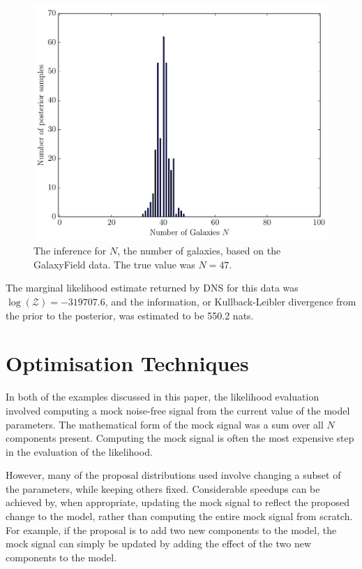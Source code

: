 \documentclass[letterpaper, 11pt]{article}
\begin{document}
\begin{figure}
\begin{center}
\includegraphics[scale=0.5]{N_galaxy_result.pdf}
\caption{The inference for $N$, the number of galaxies, based on the
GalaxyField data. The true value was $N=47$.
\label{fig:N_galaxy_result}}
\end{center}
\end{figure}

The marginal likelihood estimate returned by DNS for this data was
$\log(\mathcal{Z}) = -319707.6$, and the information, or Kullback-Leibler
divergence from the prior to the posterior, was estimated to be 550.2 nats.


\section{Optimisation Techniques}\label{sec:optimisation}
In both of the examples discussed in this paper, the likelihood evaluation
involved computing a mock noise-free signal from the current value of the
model parameters. The mathematical form of the mock signal was a sum over
all $N$ components present. Computing the mock signal is often the most
expensive step in the evaluation of the likelihood.

However, many of the proposal distributions used involve changing a subset
of the parameters, while keeping others fixed. Considerable speedups can be
achieved by, when appropriate, updating the mock signal to reflect the proposed
change to the model, rather than computing the entire mock signal from scratch.
For example, if the proposal is to add two new components to the model, the
mock signal can simply be updated by adding the effect of the two new components
to the model.
\end{document}
